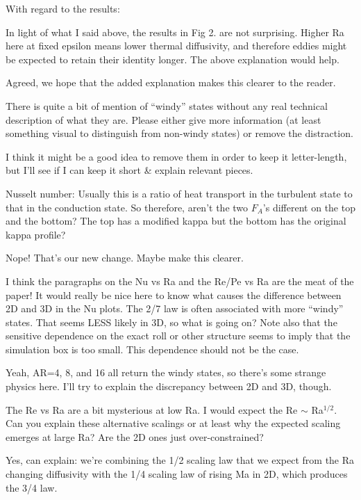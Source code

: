 \documentclass[aps, 11pt, singlecolumn]{revtex4-1} %
\begin{document}
\begin{singlespace}
\begin{myquotation}
With regard to the results:

In light of what I said above, the results in Fig 2. are not
surprising. Higher Ra here at fixed epsilon means lower thermal
diffusivity, and therefore eddies might be expected to retain their
identity longer. The above explanation would help.
\end{myquotation}
Agreed, we hope that the added explanation makes this clearer to the
reader.

\begin{myquotation}
There is quite a bit of mention of “windy” states without any real
technical description of what they are. Please either give more
information (at least something visual to distinguish from non-windy
states) or remove the distraction.
\end{myquotation}
I think it might be a good idea to remove them in order to keep it 
letter-length, but I'll see if I can keep it short \& explain 
relevant pieces.

\begin{myquotation}
Nusselt number: Usually this is a ratio of heat transport in the
turbulent state to that in the conduction state. So therefore, aren’t
the two $F_A$’s different on the top and the bottom? The top has a
modified kappa but the bottom has the original kappa profile?
\end{myquotation}
Nope!  That's our new change.  Maybe make this clearer.

\begin{myquotation}
I think the paragraphs on the Nu vs Ra and the Re/Pe vs Ra are the
meat of the paper! It would really be nice here to know what causes
the difference between 2D and 3D in the Nu plots. The 2/7 law is often
associated with more “windy” states. That seems LESS likely in 3D, so
what is going on? Note also that the sensitive dependence on the exact
roll or other structure seems to imply that the simulation box is too
small. This dependence should not be the case.
\end{myquotation}
Yeah, AR=4, 8, and 16 all return the windy states, so there's some strange
physics here.  I'll try to explain the discrepancy between 2D and 3D, though.

\begin{myquotation}
The Re vs Ra are a bit mysterious at low Ra. I would expect the Re $\sim$
Ra$^{1/2}$. Can you explain these alternative scalings or at least why the
expected scaling emerges at large Ra? Are the 2D ones just
over-constrained?
\end{myquotation}
Yes, can explain: we're combining the 1/2 scaling law that we expect from
the Ra changing diffusivity with the 1/4 scaling law of rising Ma in 2D,
which produces the 3/4 law.


\end{singlespace}
\end{document}
